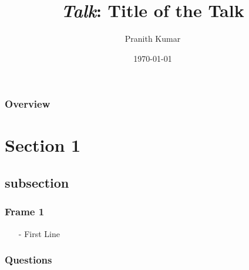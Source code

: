 \documentclass{beamer}
\title[Short Title]{\textit{Talk}: Title of the Talk}
\author{Pranith Kumar}
\institute[GT]
{
  Georgia Tech \\
  \textit{pranith@gatech.edu}
}
\date{\today}
\begin{document}
\begin{frame}
\titlepage
\end{frame}

\begin{frame}
\frametitle{Overview}
\tableofcontents
\end{frame}

\section{Section 1}

\subsection{subsection}
\begin{frame}
\frametitle{Frame 1}
\begin{itemize}
\item[-] First Line
\end{itemize}
\end{frame}

\begin{comment}
\begin{frame}
\frametitle{}
\begin{itemize}
\item[-]
\end{itemize}
\end{frame}
\end{comment}

\begin{frame}
\frametitle{Questions}
\end{frame}

\begin{comment}
\begin{frame}
\frametitle{Backup}
\end{frame}
\end{comment}
\end{document}

